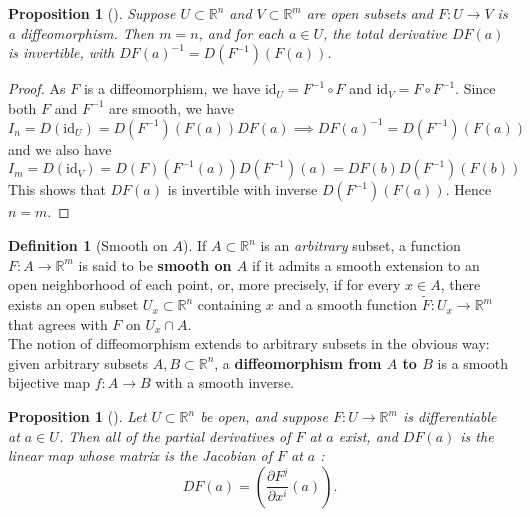 \documentclass[reqno]{amsart}
\theoremstyle{plain}%
\newtheorem{proposition}[theorem]{Proposition}
\theoremstyle{definition}
\newtheorem{definition}[theorem]{Definition}
\theoremstyle{remark}
\newcommand{\id}{{\mathrm{id}}}
\begin{document}
        \begin{proposition}[]\label{diffeo-derivative-invertible}
        Suppose $U \subset \mathbb{R}^{n}$ and $V \subset \mathbb{R}^{m}$ are open
        subsets and $F  \colon U \to V$ is a diffeomorphism. Then
        $m = n$, and for each $a \in U$, the total derivative $DF (a)$ is
        invertible, with $DF(a)^{-1} = D\left( F^{-1} \right) \left( 
        F(a) \right) $.
        \end{proposition}

        \begin{proof}
        As $F$ is a diffeomorphism, we have
        $\id_{U} = F^{-1} \circ F$ and
        $\id_{V} = F \circ F^{-1}$. Since both $F$ and $F^{-1}$ are smooth, we have
        \[
            I_n = D\left( \id_{U} \right) 
            = D \left( F^{-1} \right) \left( F(a) \right) 
            DF(a) \implies DF(a)^{-1} = D\left( F^{-1} \right) \left( F (a) \right) 
        \] 
        and we also have
        \[
        I_{m} = D \left( \id_V \right) 
        = D \left( F \right) \left( F^{-1}(a) \right) D \left( F^{-1} \right) (a)
        = DF (b) D\left( F^{-1} \right) \left( F(b) \right) 
        \] 
        This shows that
        $DF(a)$ is invertible with inverse
        $D\left( F^{-1} \right) \left( F(a) \right) $. Hence $n = m$.
        \end{proof}

        \begin{definition}[Smooth on $A$]
        If $A \subset \mathbb{R}^{n}$ is an \textit{arbitrary} subset, a function
        $F  \colon A \to \mathbb{R}^{m}$ is said to be \textbf{smooth on $A$} if it
        admits a smooth extension to an open neighborhood of each point, or, more
        precisely, if for every $x \in A$, there exists an open subset
        $U_x \subset \mathbb{R}^{n}$ containing $x$ and a smooth function
        $\tilde{F}  \colon U_x \to \mathbb{R}^{m}$ that agrees with
        $F$ on $U_x \cap A$.\\
        The notion of diffeomorphism extends to arbitrary subsets in the obvious
        way: given arbitrary subsets $A,B \subset \mathbb{R}^{n}$,
        a \textbf{diffeomorphism from $A$ to $B$} is a smooth bijective map
        $f  \colon A \to B$ with a smooth inverse.
        \end{definition}


        \begin{proposition}[]\label{diff-implies-partials-exist}
        Let $U \subset \mathbb{R}^{n}$ be open, and suppose $F  \colon U \to
        \mathbb{R}^{m}$ is differentiable at $a \in U$. Then all of the partial
        derivatives of $F$ at $a$ exist, and $DF(a)$ is the linear map whose matrix
        is the Jacobian of $F$ at $a$ :
        \[
        DF (a) = \left( \frac{\partial F^{j}}{\partial x^{i}}(a) \right).
        \] 
        \end{proposition}
\end{document}
